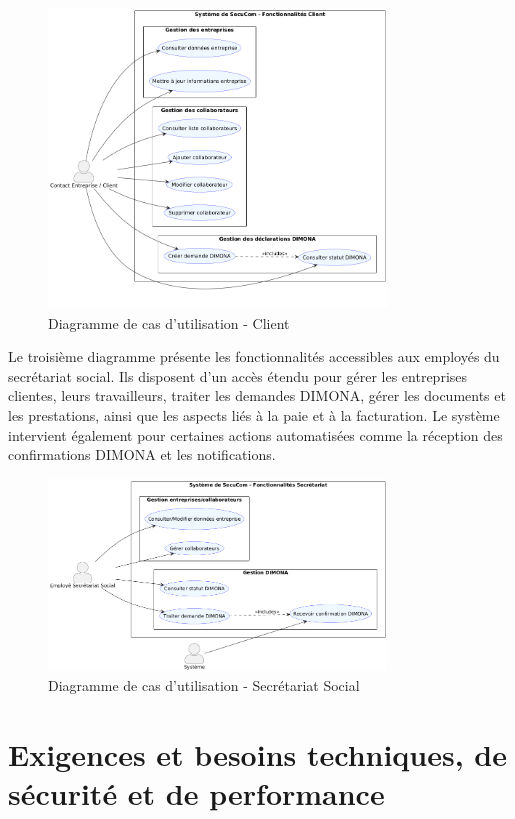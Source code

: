 \begin{figure}[h]
\centering
\includegraphics[width=0.8\textwidth]{ClientUC.png}
\caption{Diagramme de cas d'utilisation - Client}
\end{figure}

Le troisième diagramme présente les fonctionnalités accessibles aux employés du secrétariat social. Ils disposent d'un accès étendu pour gérer les entreprises clientes, leurs travailleurs, traiter les demandes DIMONA, gérer les documents et les prestations, ainsi que les aspects liés à la paie et à la facturation. Le système intervient également pour certaines actions automatisées comme la réception des confirmations DIMONA et les notifications.

\begin{figure}[h]
\centering
\includegraphics[width=0.8\textwidth]{SecretariatUC.png}
\caption{Diagramme de cas d'utilisation - Secrétariat Social}
\end{figure}

\section{Exigences et besoins techniques, de sécurité et de performance}

